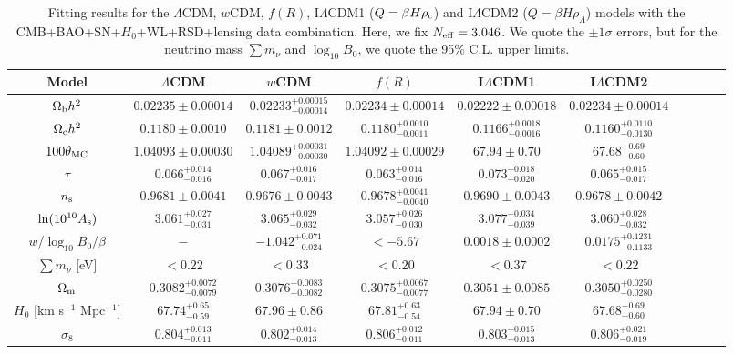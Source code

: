 \documentclass[aps,prd,nofootinbib,amsmath,amssymb,twocolumn,superscriptaddress,10pt]{revtex4}%
\begin{document}
\begin{table}
\caption{\label{tab1} Fitting results for the $\Lambda$CDM, $w$CDM, $f(R)$, I$\Lambda$CDM1 ($Q=\beta H\rho_{\rm c}$) and I$\Lambda$CDM2 ($Q=\beta H\rho_{\Lambda}$) {models} with the CMB+BAO+SN+$H_{0}$+WL+RSD+lensing data combination. Here, we fix $N_{\rm eff}=3.046$. We quote the $\pm 1\sigma$ errors, but for the neutrino mass $\sum m_{\nu}$ and $\log_{10}B_{0}$, we quote the 95\% C.L. upper limits.}
\centering
\renewcommand{\arraystretch}{1.3}
\begin{tabular}{cccccccccc}\hline\hline
 Model&$\Lambda$CDM&$w$CDM&$f(R)$&I$\Lambda$CDM1 &I$\Lambda$CDM2 \\
\hline
$\Omega_{\rm b}h^2$&$0.02235\pm0.00014$&$0.02233^{+0.00015}_{-0.00014}$&$0.02234\pm0.00014$&$0.02222\pm0.00018$&$0.02234\pm0.00014$\\
$\Omega_{\rm c}h^2$&$0.1180\pm0.0010$&$0.1181\pm0.0012$&$0.1180^{+0.0010}_{-0.0011}$&$0.1166^{+0.0018}_{-0.0016}$&$0.1160^{+0.0110}_{-0.0130}$\\
$100\theta_{\rm MC}$&$1.04093\pm0.00030$&$1.04089^{+0.00031}_{-0.00030}$&$1.04092\pm0.00029$&$67.94\pm0.70$&$67.68^{+0.69}_{-0.60}$\\
$\tau$&$0.066^{+0.014}_{-0.016}$&$0.067^{+0.016}_{-0.017}$&$0.063^{+0.014}_{-0.016}$&$0.073^{+0.018}_{-0.020}$&$0.065^{+0.015}_{-0.017}$\\
$n_{\rm s}$&$0.9681\pm0.0041$&$0.9676\pm0.0043$&$0.9678^{+0.0041}_{-0.0040}$&$0.9690\pm0.0043$&$0.9678\pm0.0042$\\
${\rm{ln}}(10^{10}A_{\rm s})$&$3.061^{+0.027}_{-0.031}$&$3.065^{+0.029}_{-0.032}$&$3.057^{+0.026}_{-0.030}$&$3.077^{+0.034}_{-0.039}$&$3.060^{+0.028}_{-0.032}$\\
$w$/$\log_{10}B_{0}$/$\beta$&$-$&$-1.042^{+0.071}_{-0.024}$&$<-5.67$&$0.0018\pm0.0002$&$0.0175^{+0.1231}_{-0.1133}$\\
$\sum m_\nu$ [eV]&$<0.22$&$<0.33$&$<0.20$&$<0.37$&$<0.22$\\
$\Omega_{\rm m}$&$0.3082^{+0.0072}_{-0.0079}$&$0.3076^{+0.0083}_{-0.0082}$&$0.3075^{+0.0067}_{-0.0077}$&$0.3051\pm0.0085$&$0.3050^{+0.0250}_{-0.0280}$\\
$H_0$ [km s$^{-1}$ Mpc$^{-1}$] &$67.74^{+0.65}_{-0.59}$&$67.96\pm0.86$&$67.81^{+0.63}_{-0.54}$&$67.94\pm0.70$&$67.68^{+0.69}_{-0.60}$\\
$\sigma_8$&$0.804^{+0.013}_{-0.011}$&$0.802^{+0.014}_{-0.013}$&$0.806^{+0.012}_{-0.011}$&$0.803^{+0.015}_{-0.013}$&$0.806^{+0.021}_{-0.019}$\\
\hline\hline
\end{tabular}
\end{table}
\end{document}
